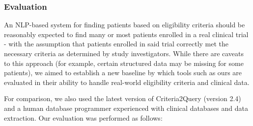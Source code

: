 \documentclass[../main.tex]{subfiles}
\begin{document}
\subsubsection{Evaluation}
An NLP-based system for finding patients based on eligibility criteria should be reasonably expected to find many or most patients enrolled in a real clinical trial - with the assumption that patients enrolled in said trial correctly met the necessary criteria as determined by study investigators. While there are caveats to this approach (for example, certain structured data may be missing for some patients), we aimed to establish a new baseline by which tools such as ours are evaluated in their ability to handle real-world eligibility criteria and clinical data.

For comparison, we also used the latest version of Criteria2Query (version 2.4) and a human database programmer experienced with clinical databases and data extraction. Our evaluation was performed as follows:
\end{document}
